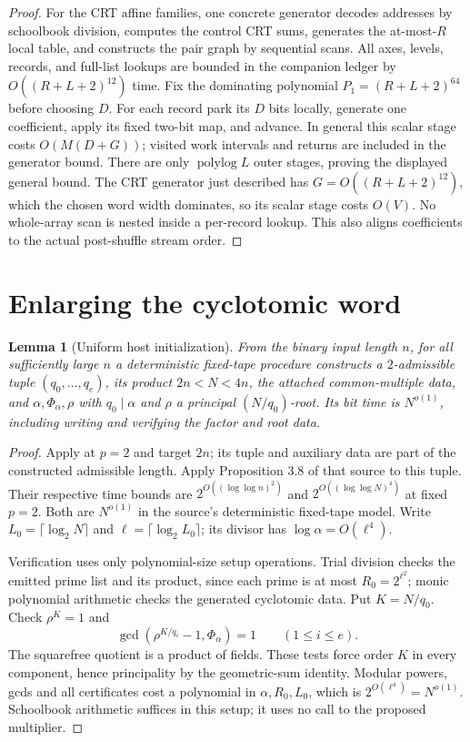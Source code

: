 \documentclass[11pt]{article}
\newtheorem{lemma}[theorem]{Lemma}
\newcommand{\polylog}{\operatorname{polylog}}
\begin{document}
\begin{proof}
For the CRT affine families, one concrete generator decodes addresses
by schoolbook division, computes the control CRT sums, generates the
at-most-$R$ local table, and constructs the pair graph by sequential
scans. All axes, levels, records, and full-list lookups are bounded in
the companion ledger by $O((R+L+2)^{12})$ time. Fix the dominating
polynomial $P_1=(R+L+2)^{64}$ before choosing $D$. For each record park
its $D$ bits locally, generate one coefficient, apply its fixed two-bit
map, and advance. In general this scalar stage costs $O(M(D+G))$;
visited work intervals and returns are included in the generator bound.
There are only $\polylog L$ outer stages, proving the displayed
general bound. The CRT generator just described has $G=O((R+L+2)^{12})$,
which the chosen word width dominates, so its scalar stage costs $O(V)$.
No whole-array scan is nested inside a per-record lookup. This also
aligns coefficients to the actual post-shuffle stream order.
\end{proof}

\section{Enlarging the cyclotomic word}

\begin{lemma}[Uniform host initialization]
\label{lem:host-initialization}
From the binary input length $n$, for all sufficiently large $n$ a
deterministic fixed-tape procedure constructs a $2$-admissible tuple
$(q_0,\ldots,q_e)$, its product $2n<N<4n$, the attached common-multiple
data, and $\alpha,\Phi_\alpha,\rho$ with $q_0\mid\alpha$ and
$\rho$ a principal $(N/q_0)$-root. Its bit time is $N^{o(1)}$,
including writing and verifying the factor and root data.
\end{lemma}
\begin{proof}
Apply \cite[Proposition 3.4]{cyclomult} at $p=2$ and target $2n$;
its tuple and auxiliary data are part of the constructed admissible
length. Apply Proposition 3.8 of that source to this tuple. Their
respective time bounds are
$2^{O((\log\log n)^2)}$ and $2^{O((\log\log N)^4)}$ at fixed $p=2$.
Both are $N^{o(1)}$ in the source's deterministic fixed-tape model.
Write $L_0=\lceil\log_2N\rceil$ and
$\ell=\lceil\log_2L_0\rceil$; its divisor has
$\log\alpha=O(\ell^4)$.

Verification uses only polynomial-size setup operations. Trial division
checks the emitted prime list and its product, since each prime is at
most $R_0=2^{\ell^2}$; monic polynomial arithmetic checks the generated
cyclotomic data. Put $K=N/q_0$. Check $\rho^K=1$ and
\[
 \gcd(\rho^{K/q_i}-1,\Phi_\alpha)=1\qquad(1\le i\le e).
\]
The squarefree quotient is a product of fields. These tests force
order $K$ in every component, hence principality by the geometric-sum
identity. Modular powers, gcds and all certificates cost a polynomial
in $\alpha,R_0,L_0$, which is $2^{O(\ell^4)}=N^{o(1)}$.
Schoolbook arithmetic suffices in this setup; it uses no call to the
proposed multiplier.
\end{proof}
\end{document}
